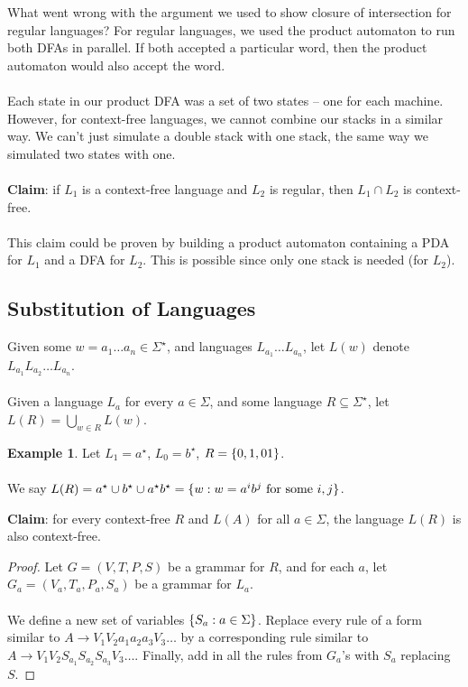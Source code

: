 \documentclass[]{article}
\DeclarePairedDelimiter{\set}{\lbrace}{\rbrace}
\theoremstyle{definition}
\newtheorem{ex}{Example}[section]
\begin{document}
          What went wrong with the argument we used to show closure of intersection for regular languages? For regular languages, we used the product automaton to run both DFAs in parallel. If both accepted a particular word, then the product automaton would also accept the word.
          \\ \\
          Each state in our product DFA was a set of two states -- one for each machine. However, for context-free languages, we cannot combine our stacks in a similar way. We can't just simulate a double stack with one stack, the same way we simulated two states with one.
          \\ \\
          \textbf{Claim}: if $L_1$ is a context-free language and $L_2$ is regular, then $L_1 \cap L_2$ is context-free.
          \\ \\
          This claim could be proven by building a product automaton containing a PDA for $L_1$ and a DFA for $L_2$. This is possible since only one stack is needed (for $L_2$).

      \subsection{Substitution of Languages}
        Given some $w = a_1 \ldots a_n \in \Sigma^\star$, and languages $L_{a_1} \ldots L_{a_n}$, let $L(w)$ denote $L_{a_1} L_{a_2} \ldots L_{a_n}$.
        \\ \\
        Given a language $L_a$ for every $a \in \Sigma$, and some language $R \subseteq \Sigma^\star$, let $L(R) = \displaystyle \bigcup_{w \in R} L(w)$.

        \begin{ex}
          Let $L_1 = a^\star$, $L_0 = b^\star$, $R = \set{0, 1, 01}$.
          \\ \\
          We say $L(R) = a^\star \cup b^\star \cup a^\star b^\star = \set{ w : w = a^i b^j \text{ for some } i, j}$.
        \end{ex}

        \textbf{Claim}: for every context-free $R$ and $L(A)$ for all $a \in \Sigma$, the language $L(R)$ is also context-free.

        \begin{proof}
          Let $G = (V, T, P, S)$ be a grammar for $R$, and for each $a$, let $G_a = (V_a, T_a, P_a, S_a)$ be a grammar for $L_a$.
          \\ \\
          We define a new set of variables $\set{ S_a : a \in \Sigma}$. Replace every rule of a form similar to $A \to V_1 V_2 a_1 a_2 a_3 V_3 \ldots$ by a corresponding rule similar to $A \to V_1 V_2 S_{a_1} S_{a_2} S_{a_3} V_3 \ldots$. Finally, add in all the rules from $G_a$'s with $S_a$ replacing $S$.
        \end{proof}
\end{document}
